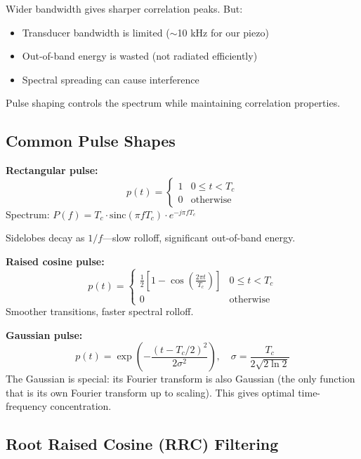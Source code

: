 \documentclass[11pt]{article}
\begin{document}
Wider bandwidth gives sharper correlation peaks. But:
\begin{itemize}
    \item Transducer bandwidth is limited ($\sim$10 kHz for our piezo)
    \item Out-of-band energy is wasted (not radiated efficiently)
    \item Spectral spreading can cause interference
\end{itemize}

Pulse shaping controls the spectrum while maintaining correlation properties.

\subsection{Common Pulse Shapes}

\textbf{Rectangular pulse:}
\begin{equation}
p(t) = \begin{cases} 1 & 0 \leq t < T_c \\ 0 & \text{otherwise} \end{cases}
\end{equation}
Spectrum: $P(f) = T_c \cdot \text{sinc}(\pi f T_c) \cdot e^{-j\pi f T_c}$

Sidelobes decay as $1/f$---slow rolloff, significant out-of-band energy.

\textbf{Raised cosine pulse:}
\begin{equation}
p(t) = \begin{cases}
\frac{1}{2}\left[1 - \cos\left(\frac{2\pi t}{T_c}\right)\right] & 0 \leq t < T_c \\
0 & \text{otherwise}
\end{cases}
\end{equation}
Smoother transitions, faster spectral rolloff.

\textbf{Gaussian pulse:}
\begin{equation}
p(t) = \exp\left(-\frac{(t - T_c/2)^2}{2\sigma^2}\right), \quad \sigma = \frac{T_c}{2\sqrt{2\ln 2}}
\end{equation}
The Gaussian is special: its Fourier transform is also Gaussian (the only function that is its own Fourier transform up to scaling). This gives optimal time-frequency concentration.

\subsection{Root Raised Cosine (RRC) Filtering}
\end{document}
